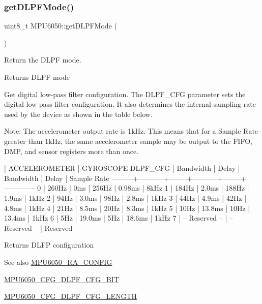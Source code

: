 \subsubsection{\texorpdfstring{getDLPFMode()}{getDLPFMode()}}
{\footnotesize\ttfamily uint8\+\_\+t M\+P\+U6050\+::get\+D\+L\+P\+F\+Mode (\begin{DoxyParamCaption}{ }\end{DoxyParamCaption})}

Return the D\+L\+PF mode.

\begin{DoxyReturn}{Returns}
D\+L\+PF mode
\end{DoxyReturn}
Get digital low-\/pass filter configuration. The D\+L\+P\+F\+\_\+\+C\+FG parameter sets the digital low pass filter configuration. It also determines the internal sampling rate used by the device as shown in the table below.

Note\+: The accelerometer output rate is 1k\+Hz. This means that for a Sample Rate greater than 1k\+Hz, the same accelerometer sample may be output to the F\+I\+FO, D\+MP, and sensor registers more than once.


\begin{DoxyPre}
         |   ACCELEROMETER    |           GYROSCOPE
DLPF\_CFG | Bandwidth | Delay  | Bandwidth | Delay  | Sample Rate
---------+-----------+--------+-----------+--------+-------------
0        | 260Hz     | 0ms    | 256Hz     | 0.98ms | 8kHz
1        | 184Hz     | 2.0ms  | 188Hz     | 1.9ms  | 1kHz
2        | 94Hz      | 3.0ms  | 98Hz      | 2.8ms  | 1kHz
3        | 44Hz      | 4.9ms  | 42Hz      | 4.8ms  | 1kHz
4        | 21Hz      | 8.5ms  | 20Hz      | 8.3ms  | 1kHz
5        | 10Hz      | 13.8ms | 10Hz      | 13.4ms | 1kHz
6        | 5Hz       | 19.0ms | 5Hz       | 18.6ms | 1kHz
7        |   -- Reserved --   |   -- Reserved --   | Reserved
\end{DoxyPre}


\begin{DoxyReturn}{Returns}
D\+L\+FP configuration 
\end{DoxyReturn}
\begin{DoxySeeAlso}{See also}
\mbox{\hyperlink{MPU6050_8h_a51c78b27e0368d91c94209dbeca4df90}{M\+P\+U6050\+\_\+\+R\+A\+\_\+\+C\+O\+N\+F\+IG}} 

\mbox{\hyperlink{MPU6050_8h_adf909a696e2ebf9ba3dba9570ae02af2}{M\+P\+U6050\+\_\+\+C\+F\+G\+\_\+\+D\+L\+P\+F\+\_\+\+C\+F\+G\+\_\+\+B\+IT}} 

\mbox{\hyperlink{MPU6050_8h_a119feeb54b957c50e0beba3f6aa2458f}{M\+P\+U6050\+\_\+\+C\+F\+G\+\_\+\+D\+L\+P\+F\+\_\+\+C\+F\+G\+\_\+\+L\+E\+N\+G\+TH}} 
\end{DoxySeeAlso}


